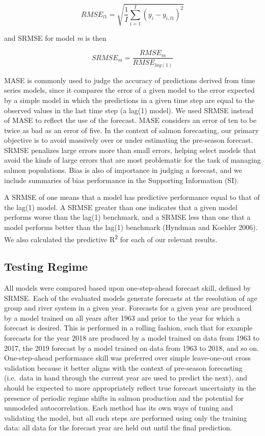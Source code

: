 \documentclass[
]{article}
\begin{document}
\[RMSE_{l1} = \sqrt{\frac{1}{I}\sum\limits_{i = 1}^I(y_{i} - y_{i,l1})^2}\]

and SRMSE for model \emph{m} is then

\[SRMSE_m = \frac{RMSE_m}{RMSE_{lag(1)}}\]

MASE is commonly used to judge the accuracy of predictions derived from time series models, since it compares the error of a given model to the error expected by a simple model in which the predictions in a given time step are equal to the observed values in the last time step (a lag(1) model). We used SRMSE instead of MASE to reflect the use of the forecast. MASE considers an error of ten to be twice as bad as an error of five. In the context of salmon forecasting, our primary objective is to avoid massively over or under estimating the pre-season forecast. SRMSE penalizes large errors more than small errors, helping select models that avoid the kinds of large errors that are most problematic for the task of managing salmon populations. Bias is also of importance in judging a forecast, and we include summaries of bias performance in the Supporting Information (SI).

A SRMSE of one means that a model has predictive performance equal to that of the lag(1) model. A SRMSE greater than one indicates that a given model performs worse than the lag(1) benchmark, and a SRMSE less than one that a model performs better than the lag(1) benchmark (Hyndman and Koehler 2006). We also calculated the predictive R\textsuperscript{2} for each of our relevant results.

\hypertarget{testing-regime}{%
\subsection{Testing Regime}\label{testing-regime}}

All models were compared based upon one-step-ahead forecast skill, defined by SRMSE. Each of the evaluated models generate forecasts at the resolution of age group and river system in a given year. Forecasts for a given year are produced by a model trained on all years after 1963 and prior to the year for which a forecast is desired. This is performed in a rolling fashion, such that for example forecasts for the year 2018 are produced by a model trained on data from 1963 to 2017, the 2019 forecast by a model trained on data from 1963 to 2018, and so on. One-step-ahead performance skill was preferred over simple leave-one-out cross validation because it better aligns with the context of pre-season forecasting (i.e.~data in hand through the current year are used to predict the next), and should be expected to more appropriately reflect true forecast uncertainty in the presence of periodic regime shifts in salmon production and the potential for unmodeled autocorrelation. Each method has its own ways of tuning and validating the model, but all such steps are performed using only the training data: all data for the forecast year are held out until the final prediction.
\end{document}
